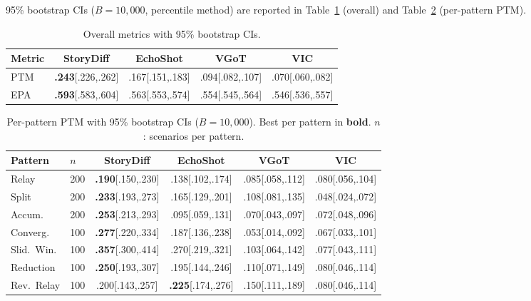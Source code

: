 \documentclass[sigconf,review,anonymous]{acmart}
\begin{document}
95\% bootstrap CIs ($B = 10{,}000$, percentile method) are reported in Table~\ref{tab:bootstrap_ci} (overall) and Table~\ref{tab:bootstrap_pattern} (per-pattern PTM).
\begin{table}[H]
\caption{Overall metrics with 95\% bootstrap CIs.}
\label{tab:bootstrap_ci}
\centering
\small
\setlength{\tabcolsep}{2.5pt}
\begin{tabular}{@{}lcccc@{}}
\toprule
Metric & StoryDiff & EchoShot & VGoT & VIC \\
\midrule
PTM & \textbf{.243}{\tiny [.226,.262]} & .167{\tiny [.151,.183]} & .094{\tiny [.082,.107]} & .070{\tiny [.060,.082]} \\
EPA & \textbf{.593}{\tiny [.583,.604]} & .563{\tiny [.553,.574]} & .554{\tiny [.545,.564]} & .546{\tiny [.536,.557]} \\
\bottomrule
\end{tabular}
\end{table}

\begin{table}[H]
\caption{Per-pattern PTM with 95\% bootstrap CIs ($B = 10{,}000$). Best per pattern in \textbf{bold}. $n$: scenarios per pattern.}
\label{tab:bootstrap_pattern}
\centering
\small
\setlength{\tabcolsep}{2pt}
\begin{tabular}{@{}ll cccc@{}}
\toprule
Pattern & $n$ & StoryDiff & EchoShot & VGoT & VIC \\
\midrule
Relay          & 200 & \textbf{.190}{\tiny [.150,.230]} & .138{\tiny [.102,.174]} & .085{\tiny [.058,.112]} & .080{\tiny [.056,.104]} \\
Split          & 200 & \textbf{.233}{\tiny [.193,.273]} & .165{\tiny [.129,.201]} & .108{\tiny [.081,.135]} & .048{\tiny [.024,.072]} \\
Accum.         & 200 & \textbf{.253}{\tiny [.213,.293]} & .095{\tiny [.059,.131]} & .070{\tiny [.043,.097]} & .072{\tiny [.048,.096]} \\
Converg.       & 100 & \textbf{.277}{\tiny [.220,.334]} & .187{\tiny [.136,.238]} & .053{\tiny [.014,.092]} & .067{\tiny [.033,.101]} \\
Slid.\ Win.    & 100 & \textbf{.357}{\tiny [.300,.414]} & .270{\tiny [.219,.321]} & .103{\tiny [.064,.142]} & .077{\tiny [.043,.111]} \\
Reduction      & 100 & \textbf{.250}{\tiny [.193,.307]} & .195{\tiny [.144,.246]} & .110{\tiny [.071,.149]} & .080{\tiny [.046,.114]} \\
Rev.\ Relay    & 100 & .200{\tiny [.143,.257]} & \textbf{.225}{\tiny [.174,.276]} & .150{\tiny [.111,.189]} & .080{\tiny [.046,.114]} \\
\bottomrule
\end{tabular}
\end{table}
\end{document}
